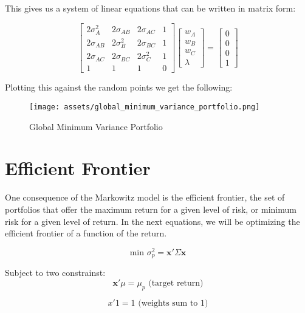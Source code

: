 \documentclass[journal,transmag]{IEEEtran}
\begin{document}
\noindent This gives us a system of linear equations that can be written in matrix form:

\begin{equation}
\begin{bmatrix} 
2\sigma_A^2 & 2\sigma_{AB} & 2\sigma_{AC} & 1 \\
2\sigma_{AB} & 2\sigma_B^2 & 2\sigma_{BC} & 1 \\
2\sigma_{AC} & 2\sigma_{BC} & 2\sigma_C^2 & 1 \\
1 & 1 & 1 & 0
\end{bmatrix}
\begin{bmatrix}
w_A \\
w_B \\
w_C \\
\lambda
\end{bmatrix} = 
\begin{bmatrix}
0 \\
0 \\
0 \\
1
\end{bmatrix}
\end{equation}

Plotting this against the random points we get the following:
\begin{figure}[H]
\centering
\texttt{[image: assets/global\_minimum\_variance\_portfolio.png]}
\caption{Global Minimum Variance Portfolio}
\end{figure}

\section{Efficient Frontier}
One consequence of the Markowitz model is the efficient frontier, the set of portfolios that offer the maximum return for a given level of risk,
or minimum risk for a given level of return. In the next equations, we will be optimizing the efficient frontier of a function of the return. 


\begin{equation}
  \text{min } \sigma_p^2 = \mathbf{x}' \Sigma \mathbf{x}
\end{equation}

Subject to two constrainst:
\begin{equation}
  \mathbf{x}' \mu = \mu_p \text{ (target return)}
\end{equation}

\begin{equation}
x'1 = 1 \text{ (weights sum to 1)}
\end{equation}
\end{document}
